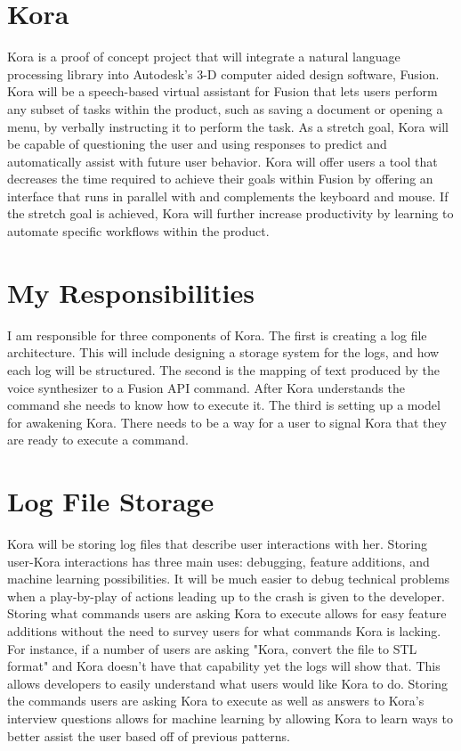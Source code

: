 \documentclass[onecolumn, draftclsnofoot,10pt, compsoc]{IEEEtran}
\begin{document}
	\section{Kora}
		Kora is a proof of concept project that will integrate a natural language processing library into Autodesk's 3-D computer aided design software, Fusion.
		Kora will be a speech-based virtual assistant for Fusion that lets users perform any subset of tasks within the product, such as saving a document or opening a menu, by verbally instructing it to perform the task.
		As a stretch goal, Kora will be capable of questioning the user and using responses to predict and automatically assist with future user behavior.
		Kora will offer users a tool that decreases the time required to achieve their goals within Fusion by offering an interface that runs in parallel with and complements the keyboard and mouse.
		If the stretch goal is achieved, Kora will further increase productivity by learning to automate specific workflows within the product.
		
		
	\section{My Responsibilities}
		I am responsible for three components of Kora.
		The first is creating a log file architecture.
		This will include designing a storage system for the logs, and how each log will be structured.
		The second is the mapping of text produced by the voice synthesizer to a Fusion API command.
		After Kora understands the command she needs to know how to execute it.
		The third is setting up a model for awakening Kora.
		There needs to be a way for a user to signal Kora that they are ready to execute a command.
		
		
	\section{Log File Storage}
		Kora will be storing log files that describe user interactions with her.
		Storing user-Kora interactions has three main uses: debugging, feature additions, and machine learning possibilities.
		It will be much easier to debug technical problems when a play-by-play of actions leading up to the crash is given to the developer.
		Storing what commands users are asking Kora to execute allows for easy feature additions without the need to survey users for what commands Kora is lacking.
		For instance, if a number of users are asking "Kora, convert the file to STL format" and Kora doesn't have that capability yet the logs will show that.
		This allows developers to easily understand what users would like Kora to do.
		Storing the commands users are asking Kora to execute as well as answers to Kora's interview questions allows for machine learning by allowing Kora to learn ways to better assist the user based off of previous patterns.
\end{document}
